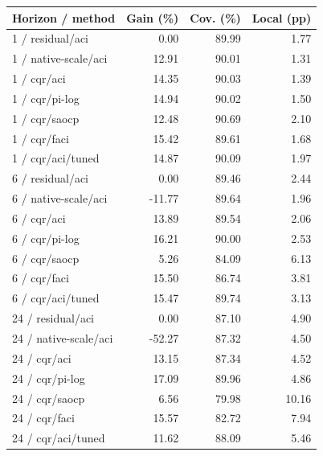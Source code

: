 \begin{tabular}{lrrr}
\toprule
Horizon / method & Gain (\%) & Cov. (\%) & Local (pp) \\
\midrule
1 / residual/aci & 0.00 & 89.99 & 1.77 \\
1 / native-scale/aci & 12.91 & 90.01 & 1.31 \\
1 / cqr/aci & 14.35 & 90.03 & 1.39 \\
1 / cqr/pi-log & 14.94 & 90.02 & 1.50 \\
1 / cqr/saocp & 12.48 & 90.69 & 2.10 \\
1 / cqr/faci & 15.42 & 89.61 & 1.68 \\
1 / cqr/aci/tuned & 14.87 & 90.09 & 1.97 \\
6 / residual/aci & 0.00 & 89.46 & 2.44 \\
6 / native-scale/aci & -11.77 & 89.64 & 1.96 \\
6 / cqr/aci & 13.89 & 89.54 & 2.06 \\
6 / cqr/pi-log & 16.21 & 90.00 & 2.53 \\
6 / cqr/saocp & 5.26 & 84.09 & 6.13 \\
6 / cqr/faci & 15.50 & 86.74 & 3.81 \\
6 / cqr/aci/tuned & 15.47 & 89.74 & 3.13 \\
24 / residual/aci & 0.00 & 87.10 & 4.90 \\
24 / native-scale/aci & -52.27 & 87.32 & 4.50 \\
24 / cqr/aci & 13.15 & 87.34 & 4.52 \\
24 / cqr/pi-log & 17.09 & 89.96 & 4.86 \\
24 / cqr/saocp & 6.56 & 79.98 & 10.16 \\
24 / cqr/faci & 15.57 & 82.72 & 7.94 \\
24 / cqr/aci/tuned & 11.62 & 88.09 & 5.46 \\
\bottomrule
\end{tabular}